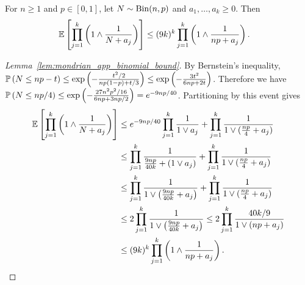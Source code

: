 \begin{lemma}%
  \label{lem:mondrian_app_binomial_bound}
  For $n \geq 1$ and $p \in [0,1]$,
  let $N \sim \Bin(n, p)$ and $a_1, \ldots, a_k \geq 0$.
  Then
  \begin{align*}
    \E\left[
      \prod_{j=1}^k
      \left(
        1 \wedge
        \frac{1}{N + a_j}
      \right)
    \right]
    &\leq
    (9k)^k
    \prod_{j=1}^k
    \left(
      1 \wedge
      \frac{1}{n p + a_j}
    \right).
  \end{align*}
\end{lemma}

\begin{proof}[Lemma~\ref{lem:mondrian_app_binomial_bound}]
  By Bernstein's inequality,
  $\P\left( N \leq n p - t \right)
  \leq \exp\left(-\frac{t^2/2}{n p(1-p) + t/3}\right)
  \leq \exp\left(-\frac{3t^2}{6n p + 2t}\right)$.
  Therefore we have
  $\P\left( N \leq n p/4 \right)
  \leq \exp\left(-\frac{27 n^2 p^2 / 16}{6n p + 3 n p / 2}\right)
  = e^{-9 n p / 40}$.
  Partitioning by this event gives
  \begin{align*}
    \E\left[
      \prod_{j=1}^k
      \left(
        1 \wedge
        \frac{1}{N + a_j}
      \right)
    \right]
    &\leq
    e^{-9 n p / 40}
    \prod_{j=1}^k
    \frac{1}{1 \vee a_j}
    + \prod_{j=1}^k
    \frac{1}{1 \vee (\frac{n p}{4} + a_j)} \\
    &\leq
    \prod_{j=1}^k
    \frac{1}{\frac{9 n p}{40k} + (1 \vee a_j)}
    + \prod_{j=1}^k
    \frac{1}{1 \vee (\frac{n p}{4} + a_j)} \\
    &\leq
    \prod_{j=1}^k
    \frac{1}{1 \vee \left(\frac{9 n p}{40k} + a_j\right)}
    + \prod_{j=1}^k
    \frac{1}{1 \vee (\frac{n p}{4} + a_j)} \\
    &\leq
    2 \prod_{j=1}^k
    \frac{1}{1 \vee \left(\frac{9 n p}{40k} + a_j\right)}
    \leq
    2 \prod_{j=1}^k
    \frac{40k/9}{1 \vee \left(n p + a_j\right)} \\
    &\leq
    (9k)^k
    \prod_{j=1}^k
    \left(
      1 \wedge
      \frac{1}{n p + a_j}
    \right).
  \end{align*}
\end{proof}


